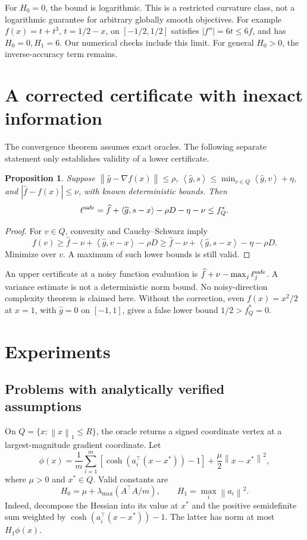 \documentclass[11pt]{article}
\newtheorem{proposition}[theorem]{Proposition}
\newcommand{\norm}[1]{\left\|#1\right\|}
\newcommand{\inner}[2]{\left\langle#1,#2\right\rangle}
\begin{document}
For $H_0=0$, the bound is logarithmic. This is a restricted curvature
class, not a logarithmic guarantee for arbitrary globally smooth objectives.
For example $f(x)=t+t^3$, $t=1/2-x$, on $[-1/2,1/2]$ satisfies
$|f''|=6t\le6f$, and has $H_0=0,H_1=6$. Our numerical checks include
this limit. For general $H_0>0$, the inverse-accuracy term remains.





\section{A corrected certificate with inexact information}
The convergence theorem assumes exact oracles. The following separate
statement only establishes validity of a lower certificate.

\begin{proposition}\label{prop:noise}
Suppose $\norm{\widehat g-\nabla f(x)}\le\rho$,
$\inner{\widehat g}{s}\le\min_{v\in Q}\inner{\widehat g}{v}+\eta$,
and $|\widehat f-f(x)|\le\nu$, with known deterministic bounds.
Then
\[
 \ell^{\rm safe}=\widehat f+\inner{\widehat g}{s-x}
                     -\rho D-\eta-\nu\le f_Q^*.
\]
\end{proposition}
\begin{proof}
For $v\in Q$, convexity and Cauchy--Schwarz imply
\[
 f(v)\ge\widehat f-\nu+\inner{\widehat g}{v-x}-\rho D
      \ge\widehat f-\nu+\inner{\widehat g}{s-x}-\eta-\rho D.
\]
Minimize over $v$. A maximum of such lower bounds is still valid.
\end{proof}
An upper certificate at a noisy function evaluation is
$\widehat f+\nu-\max_j\ell_j^{\rm safe}$. A variance estimate is not
a deterministic norm bound. No noisy-direction complexity theorem is
claimed here. Without the correction, even $f(x)=x^2/2$ at $x=1$,
with $\widehat g=0$ on $[-1,1]$, gives a false lower bound $1/2>f_Q^*=0$.

\section{Experiments}
\subsection{Problems with analytically verified assumptions}
On $Q=\{x:\norm x_1\le R\}$, the oracle returns a signed coordinate
vertex at a largest-magnitude gradient coordinate. Let
\[
 \phi(x)=\frac1m\sum_{i=1}^m[\cosh(a_i^\top(x-x^*))-1]
                        +\frac\mu2\norm{x-x^*}^2,
\]
where $\mu>0$ and $x^*\in Q$. Valid constants are
\[
 H_0=\mu+\lambda_{\max}(A^\top A/m),\qquad
 H_1=\max_i\norm{a_i}^2.
\]
Indeed, decompose the Hessian into its value at $x^*$ and the positive
semidefinite sum weighted by $\cosh(a_i^\top(x-x^*))-1$.
The latter has norm at most $H_1\phi(x)$.
\end{document}
